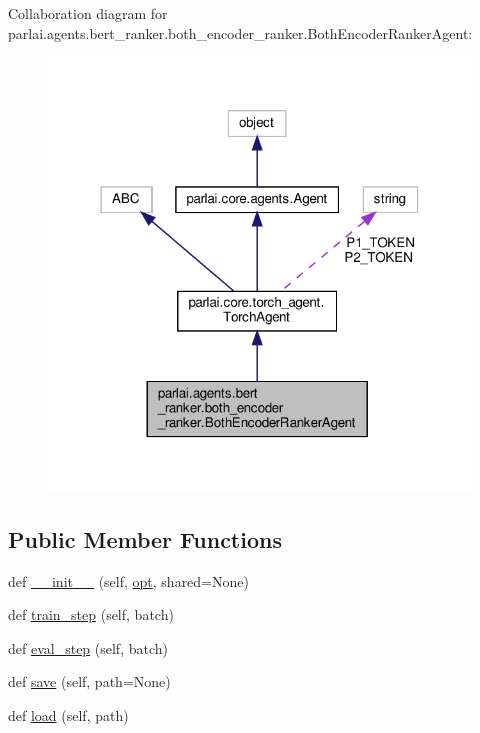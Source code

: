 Collaboration diagram for parlai.\+agents.\+bert\+\_\+ranker.\+both\+\_\+encoder\+\_\+ranker.\+Both\+Encoder\+Ranker\+Agent\+:
\nopagebreak
\begin{figure}[H]
\begin{center}
\leavevmode
\includegraphics[width=318pt]{classparlai_1_1agents_1_1bert__ranker_1_1both__encoder__ranker_1_1BothEncoderRankerAgent__coll__graph}
\end{center}
\end{figure}
\subsection*{Public Member Functions}
\begin{DoxyCompactItemize}
\item 
def \hyperlink{classparlai_1_1agents_1_1bert__ranker_1_1both__encoder__ranker_1_1BothEncoderRankerAgent_a96d864d610277625195f71a615c0f585}{\+\_\+\+\_\+init\+\_\+\+\_\+} (self, \hyperlink{classparlai_1_1core_1_1torch__agent_1_1TorchAgent_a785bb920cf8c8afc3e9bf6a8b77e335a}{opt}, shared=None)
\item 
def \hyperlink{classparlai_1_1agents_1_1bert__ranker_1_1both__encoder__ranker_1_1BothEncoderRankerAgent_a49ef7547db36c1570b8c10d0c8bee42e}{train\+\_\+step} (self, batch)
\item 
def \hyperlink{classparlai_1_1agents_1_1bert__ranker_1_1both__encoder__ranker_1_1BothEncoderRankerAgent_a6d189366af4a1264770d59e4b114967a}{eval\+\_\+step} (self, batch)
\item 
def \hyperlink{classparlai_1_1agents_1_1bert__ranker_1_1both__encoder__ranker_1_1BothEncoderRankerAgent_a5e8419dfd48e5a9b0a999058a9537831}{save} (self, path=None)
\item 
def \hyperlink{classparlai_1_1agents_1_1bert__ranker_1_1both__encoder__ranker_1_1BothEncoderRankerAgent_a3900966ef98a770cf6e871bb7de67907}{load} (self, path)
\end{DoxyCompactItemize}
